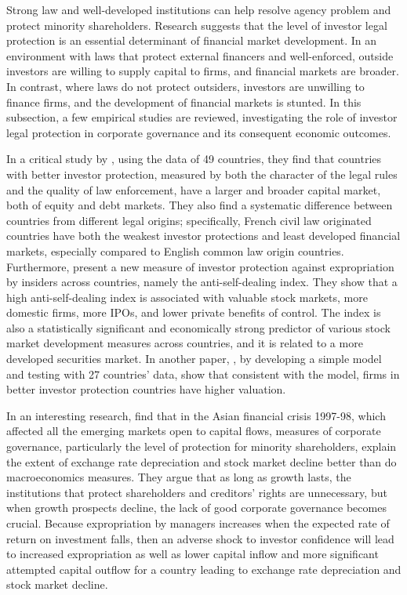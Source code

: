 \documentclass[final,1p,authoryear]{elsarticle}
\begin{document}
Strong law and well-developed institutions can help resolve agency problem and protect minority shareholders. Research suggests that the level of investor legal protection is an essential determinant of financial market development. In an environment with laws that protect external financers and well-enforced, outside investors are willing to supply capital to firms, and financial markets are broader. In contrast, where laws do not protect outsiders, investors are unwilling to finance firms, and the development of financial markets is stunted. In this subsection, a few empirical studies are reviewed, investigating the role of investor legal protection in corporate governance and its consequent economic outcomes.

In a critical study by \cite{10.2307/2329518}, using the data of 49 countries, they find that countries with better investor protection, measured by both the character of the legal rules and the quality of law enforcement, have a larger and broader capital market, both of equity and debt markets. They also find a systematic difference between countries from different legal origins; specifically, French civil law originated countries have both the weakest investor protections and least developed financial markets, especially compared to English common law origin countries. Furthermore, \cite{19501} present a new measure of investor protection against expropriation by insiders across countries, namely the anti-self-dealing index. They show that a high anti-self-dealing index is associated with valuable stock markets, more domestic firms, more IPOs, and lower private benefits of control. The index is also a statistically signiﬁcant and economically strong predictor of various stock market development measures across countries, and it is related to a more developed securities market. In another paper, \cite{doi:10.1111/1540-6261.00457}, by developing a simple model and testing with 27 countries' data, show that consistent with the model, firms in better investor protection countries have higher valuation. 

In an interesting research, \cite{JOHNSON2000141} find that in the Asian financial crisis 1997-98, which affected all the emerging markets open to capital flows, measures of corporate governance, particularly the level of protection for minority shareholders, explain the extent of exchange rate depreciation and stock market decline better than do macroeconomics measures. They argue that as long as growth lasts, the institutions that protect shareholders and creditors' rights are unnecessary, but when growth prospects decline, the lack of good corporate governance becomes crucial. Because expropriation by managers increases when the expected rate of return on investment falls, then an adverse shock to investor confidence will lead to increased expropriation as well as lower capital inflow and more significant attempted capital outflow for a country leading to exchange rate depreciation and stock market decline.
\end{document}
